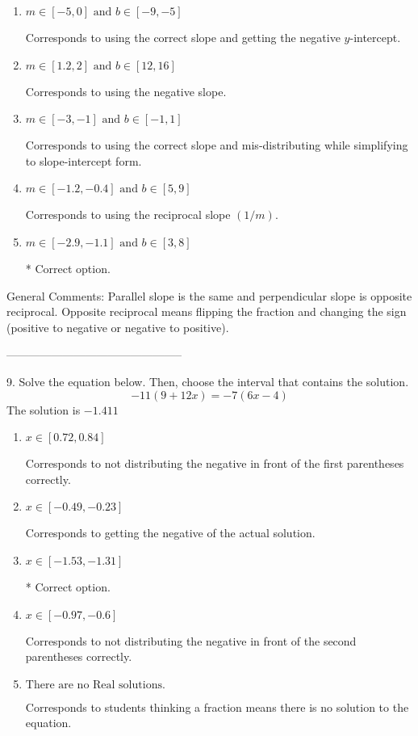 \documentclass{article}[10pt]
\begin{document}
\begin{enumerate}[label=\Alph*.] 
\item $ m \in [-5, 0] \text{ and } b \in [-9, -5] $ 

  Corresponds to using the correct slope and getting the negative $y$-intercept. 
\item $ m \in [1.2, 2] \text{ and } b \in [12, 16] $ 

  Corresponds to using the negative slope. 
\item $ m \in [-3, -1] \text{ and } b \in [-1, 1] $ 

  Corresponds to using the correct slope and mis-distributing while simplifying to slope-intercept form. 
\item $ m \in [-1.2, -0.4] \text{ and } b \in [5, 9] $ 

  Corresponds to using the reciprocal slope $(1/m)$. 
\item $ m \in [-2.9, -1.1] \text{ and } b \in [3, 8] $ 

 * Correct option. 
\end{enumerate} 
 
General Comments: Parallel slope is the same and perpendicular slope is opposite reciprocal. Opposite reciprocal means flipping the fraction and changing the sign (positive to negative or negative to positive).

-----------------------------------------------

9. Solve the equation below. Then, choose the interval that contains the solution.
$$ -11(9+12 x) = -7(6 x-4) $$ 
The solution is $ -1.411 $ 

\begin{enumerate}[label=\Alph*.] 
\item $ x \in [0.72, 0.84] $ 

  Corresponds to not distributing the negative in front of the first parentheses correctly. 
\item $ x \in [-0.49, -0.23] $ 

  Corresponds to getting the negative of the actual solution. 
\item $ x \in [-1.53, -1.31] $ 

 * Correct option. 
\item $ x \in [-0.97, -0.6] $ 

  Corresponds to not distributing the negative in front of the second parentheses correctly. 
\item $ \text{There are no Real solutions. } $ 

 Corresponds to students thinking a fraction means there is no solution to the equation. 
\end{enumerate} 
 
\end{document}
